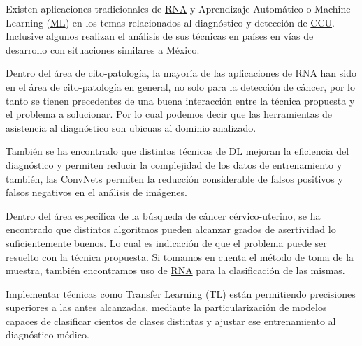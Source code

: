 
Existen aplicaciones tradicionales de \hyperlink{abbr}{RNA} y Aprendizaje
Automático o Machine Learning (\hyperlink{abbr}{ML}) en los temas relacionados al diagnóstico y detección de
\hyperlink{abbr}{CCU}. Inclusive algunos realizan el análisis de sus técnicas en
países en vías de desarrollo con situaciones similares a
México.~\cite{HussainWanandIshakWanandFadzilah1994}

Dentro del área de cito-patología, la mayoría de las aplicaciones de RNA han
sido en el área de cito-patología en general, no solo para la detección de
cáncer, por lo tanto se tienen precedentes de una buena interacción entre la
técnica propuesta y el problema a solucionar. Por lo cual podemos decir que las
herramientas de asistencia al diagnóstico son ubicuas al dominio
analizado.~\cite{Pouliakis2016}

También se ha encontrado que distintas técnicas de \hyperlink{abbr}{DL} mejoran
la eficiencia del diagnóstico y permiten reducir la complejidad de los datos de
entrenamiento y también, las ConvNets permiten la reducción considerable de
falsos positivos y falsos negativos en el análisis de
imágenes.~\cite{Khosravi2017}

Dentro del área específica de la búsqueda de cáncer cérvico-uterino, se ha
encontrado que distintos algoritmos pueden alcanzar grados de asertividad lo
suficientemente buenos. Lo cual es indicación de que el problema puede ser
resuelto con la técnica propuesta. Si tomamos en cuenta el método de toma de la
muestra, también encontramos uso de \hyperlink{abbr}{RNA} para  la
clasificación de las mismas.~\cite{Ampazis2004}

Implementar técnicas como Transfer Learning
(\hyperlink{abbr}{TL}) están permitiendo
precisiones superiores a las antes alcanzadas, mediante la particularización de
modelos capaces de clasificar cientos de clases distintas y ajustar ese
entrenamiento al diagnóstico
médico.~\cite{Sarwar2013}\cite{Sarwar2015}\cite{Zhang2017}


